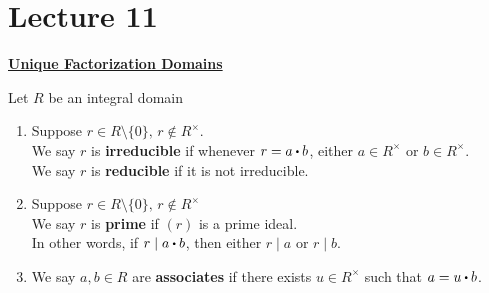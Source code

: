 \documentclass[../Main.tex]{subfiles}
\begin{document}
\chapter{Lecture 11}
\underline{\textbf{\Large Unique Factorization Domains}}

\begin{dfn}[title = {Irreducible/Reducible, Prime, Associate Elements}]
	Let $R$ be an integral domain
	\begin{enumerate}
		\item Suppose $r\in R\setminus\{0\},\, r\notin R^\times$.\\
		We say $r$ is \textbf{irreducible} if whenever $r=a\rdot b$, either $a\in R^\times$ or $b\in R^\times$.\\
		We say $r$ is \textbf{reducible} if it is not irreducible.
		\item Suppose $r\in R\setminus\{0\},\, r\notin R^\times$\\
		We say $r$ is \textbf{prime} if $(r)$ is a prime ideal.\\
		In other words, if $r\mid a\rdot b$, then either $r\mid a$ or $r\mid b$.
		\item We say $a,b \in R$ are \textbf{associates} if there exists $u\in R^\times$ such that $a=u\rdot b$.
	\end{enumerate}
\end{dfn}
\end{document}
